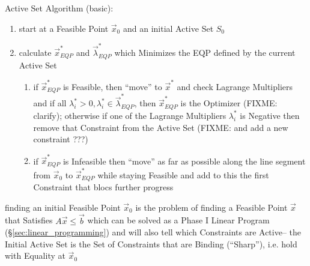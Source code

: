 Active Set Algorithm (basic):
\begin{enumerate}
  \item start at a Feasible Point $\vec{x}_0$ and an initial Active Set $S_0$
  \item calculate $\vec{x}^*_{EQP}$ and $\vec{\lambda}^*_{EQP}$ which Minimizes
    the EQP defined by the current Active Set
    \begin{enumerate}
      \item if $\vec{x}^*_{EQP}$ is Feasible, then ``move'' to $\vec{x}^*$ and
        check Lagrange Multipliers and if all $\lambda^*_i > 0, \lambda^*_i \in
        \vec{\lambda}^*_{EQP}$, then $\vec{x}^*_{EQP}$ is the Optimizer (FIXME:
        clarify); otherwise if one of the Lagrange Multipliers $\lambda^*_i$ is
        Negative then remove that Constraint from the Active Set (FIXME: and
        add a new constraint ???)
      \item if $\vec{x}^*_{EQP}$ is Infeasible then ``move'' as far as possible
        along the line segment from $\vec{x}_0$ to $\vec{x}^*_{EQP}$ while
        staying Feasible and add to this the first Constraint that blocs
        further progress
    \end{enumerate}
\end{enumerate}

finding an initial Feasible Point $\vec{x}_0$ is the problem of finding a
Feasible Point $\vec{x}$ that Satisfies $A\vec{x} \leq \vec{b}$ which can be
solved as a Phase I Linear Program (\S\ref{sec:linear_programming}) and will
also tell which Constraints are Active-- the Initial Active Set is the Set of
Constraints that are Binding (``Sharp''), i.e. hold with Equality at
$\vec{x}_0$

